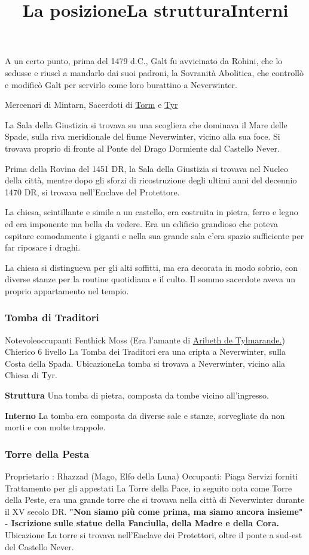 \documentclass{article}
\begin{document}
A un certo punto, prima del 1479 d.C., Galt fu avvicinato da Rohini, che lo sedusse e riuscì a mandarlo dai suoi padroni, la Sovranità Abolitica, che controllò e modificò Galt per servirlo come loro burattino a Neverwinter.


Mercenari di Mintarn, Sacerdoti di \href{https://forgottenrealms.fandom.com/wiki/Torm}{Torm} e \href{https://forgottenrealms.fandom.com/wiki/Tyr}{Tyr}
\newline


\title{La posizione}\newline
La Sala della Giustizia si trovava su una scogliera che dominava il Mare delle Spade, sulla riva meridionale del fiume Neverwinter, vicino alla sua foce. Si trovava proprio di fronte al Ponte del Drago Dormiente dal Castello Never.

Prima della Rovina del 1451 DR, la Sala della Giustizia si trovava nel Nucleo della città, mentre dopo gli sforzi di ricostruzione degli ultimi anni del decennio 1470 DR, si trovava nell'Enclave del Protettore.\newline

\title{La struttura}
La chiesa, scintillante e simile a un castello, era costruita in pietra, ferro e legno ed era imponente ma bella da vedere. Era un edificio grandioso che poteva ospitare comodamente i giganti e nella sua grande sala c'era spazio sufficiente per far riposare i draghi.\newline
\title{Interni}
La chiesa si distingueva per gli alti soffitti, ma era decorata in modo sobrio, con diverse stanze per la routine quotidiana e il culto. Il sommo sacerdote aveva un proprio appartamento nel tempio.
              \subsubsection{Tomba di Traditori }
Notevoleoccupanti
Fenthick Moss (Era l'amante di \href{https://forgottenrealms.fandom.com/wiki/Aribeth_de_Tylmarande}{Aribeth de Tylmarande.}) Chierico 6 livello
La Tomba dei Traditori era una cripta a Neverwinter, sulla Costa della Spada.
UbicazioneLa tomba si trovava a Neverwinter, vicino alla Chiesa di Tyr.

\textbf{Struttura}
Una tomba di pietra, composta da tombe vicino all'ingresso.

\textbf{Interno}
La tomba era composta da diverse sale e stanze, sorvegliate da non morti e con molte trappole.
              \subsubsection{Torre della Pesta}
Proprietario : Rhazzad (Mago, Elfo della Luna) \newline
Occupanti: Piaga \newline
Servizi forniti
Trattamento per gli appestati
La Torre della Pace, in seguito nota come Torre della Peste, era una grande torre che si trovava nella città di Neverwinter durante il XV secolo DR.
\textbf{"Non siamo più come prima, ma siamo ancora insieme"
- Iscrizione sulle statue della Fanciulla, della Madre e della Cora.}
Ubicazione\newline
La torre si trovava nell'Enclave dei Protettori, oltre il ponte a sud-est del Castello Never.
\end{document}
